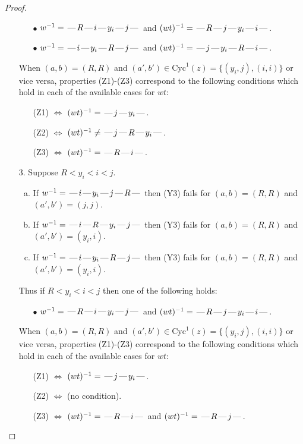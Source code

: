 \documentclass[10pt]{article}
\theoremstyle{definition}
\theoremstyle{definition}
\def\dash{\text{\hspace{0.5mm}---\hspace{0.5mm}}}
\def\Cyc{\mathrm{Cyc}}
\begin{document}
\begin{proof}
\begin{enumerate}
\begin{enumerate}
\item[$\bullet$] $w^{-1} = \dash R\dash i\dash y_i\dash j\dash $ and $(wt)^{-1} = \dash R\dash j\dash y_i\dash i\dash $.
\item[$\bullet$] $w^{-1} = \dash i\dash y_i\dash R\dash j\dash $ and $(wt)^{-1} = \dash j\dash y_i\dash R\dash i\dash $.
\end{enumerate}
When $(a,b)= (R,R)$ and $(a',b')\in \Cyc^1(z)=\{(y_i,j),(i,i)\}$ or vice versa,
properties (Z1)-(Z3) correspond to the following conditions which
hold in each of the available cases for $wt$:
\begin{enumerate}
\item[](Z1) $\Leftrightarrow$ $(wt)^{-1} = \dash j \dash y_i \dash$.
\item[](Z2) $\Leftrightarrow$ $(wt)^{-1} \neq \dash j \dash R \dash y_i \dash$.
\item[](Z3) $\Leftrightarrow$ $(wt)^{-1} = \dash R \dash i \dash$.
\end{enumerate}
\item[$3$.] Suppose $R < y_i < i < j$.
\begin{enumerate}[(a)]
\item If $w^{-1} = \dash i\dash y_i\dash j\dash R\dash $ then (Y3) fails for $(a,b)=(R,R)$ and $(a',b')=(j,j)$.
\item If $w^{-1} = \dash i\dash R\dash y_i\dash j\dash $ then (Y3) fails for $(a,b)=(R,R)$ and $(a',b')=(y_i,i)$.
\item If $w^{-1} = \dash i\dash y_i\dash R\dash j\dash $ then (Y3) fails for $(a,b)=(R,R)$ and $(a',b')=(y_i,i)$.
\end{enumerate}
Thus if $R < y_i < i < j$ then one of the following holds:
\begin{enumerate}
\item[$\bullet$] $w^{-1} = \dash R\dash i\dash y_i\dash j\dash $ and $(wt)^{-1} = \dash R\dash j\dash y_i\dash i\dash $.
\end{enumerate}
When $(a,b)= (R,R)$ and $(a',b')\in \Cyc^1(z)=\{(y_i,j),(i,i)\}$ or vice versa,
properties (Z1)-(Z3) correspond to the following conditions which
hold in each of the available cases for $wt$:
\begin{enumerate}
\item[](Z1) $\Leftrightarrow$ $(wt)^{-1} = \dash j \dash y_i \dash$.
\item[](Z2) $\Leftrightarrow$ (no condition).
\item[](Z3) $\Leftrightarrow$ $(wt)^{-1} = \dash R \dash i \dash$  and $(wt)^{-1} = \dash R \dash j \dash$.

\end{enumerate}
\end{enumerate}
\end{proof}
\end{document}
